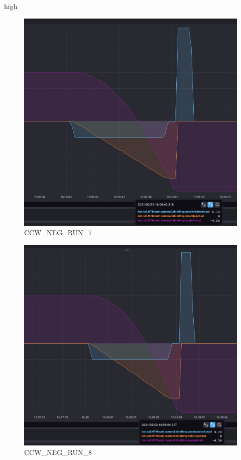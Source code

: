 high\documentclass[SE,lsstdraft,authoryear,toc]{lsstdoc}
\begin{document}
\begin{figure}[h!]
  \includegraphics[width=\linewidth]{media/CCW_design_speed_neg_test7.png}
  \caption{CCW\_NEG\_RUN\_7}
  \label{fig:CCW_NEG_RUN_7}
\end{figure}
\begin{figure}[h!]
  \includegraphics[width=\linewidth]{media/CCW_design_speed_neg_test8.png}
  \caption{CCW\_NEG\_RUN\_8}
  \label{fig:CCW_NEG_RUN_8}
\end{figure}
\end{document}
